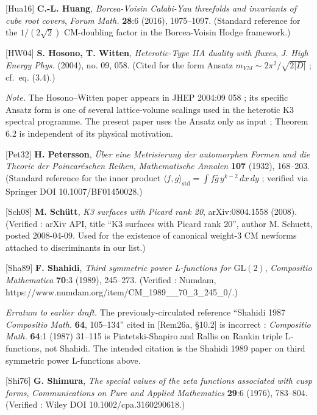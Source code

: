 \documentclass[
  11pt,
  a4paper,
]{amsart}
\begin{document}
{[}Hua16{]} \textbf{C.-L. Huang}, \emph{Borcea-Voisin Calabi-Yau threefolds and invariants of cube root covers}, \emph{Forum Math.} \textbf{28}:6 (2016), 1075--1097. (Standard reference for the \(1/(2\sqrt 2)\) CM-doubling factor in the Borcea-Voisin Hodge framework.)

{[}HW04{]} \textbf{S. Hosono, T. Witten}, \emph{Heterotic-Type IIA duality with fluxes}, \emph{J. High Energy Phys.} (2004), no. 09, 058. (Cited for the form Ansatz \(m_{YM}\sim 2\pi^{2}/\sqrt{2|D|}\) ; cf.~eq. (3.4).)

\emph{Note.} The Hosono--Witten paper appears in JHEP 2004:09 058 ; its specific Ansatz form is one of several lattice-volume scalings used in the heterotic K3 spectral programme. The present paper uses the Ansatz only as input ; Theorem 6.2 is independent of its physical motivation.

{[}Pet32{]} \textbf{H. Petersson}, \emph{Über eine Metrisierung der automorphen Formen und die Theorie der Poincaréschen Reihen}, \emph{Mathematische Annalen} \textbf{107} (1932), 168--203. (Standard reference for the inner product \(\langle f, g\rangle_{\mathrm{std}} = \int f \bar g\, y^{k-2}\,dx\,dy\) ; verified via Springer DOI 10.1007/BF01450028.)

{[}Sch08{]} \textbf{M. Schütt}, \emph{K3 surfaces with Picard rank 20}, arXiv:0804.1558 (2008). (Verified : arXiv API, title ``K3 surfaces with Picard rank 20'', author M. Schuett, posted 2008-04-09. Used for the existence of canonical weight-3 CM newforms attached to discriminants in our list.)

{[}Sha89{]} \textbf{F. Shahidi}, \emph{Third symmetric power L-functions for \(\mathrm{GL}(2)\)}, \emph{Compositio Mathematica} \textbf{70}:3 (1989), 245--273. (Verified : Numdam, https://www.numdam.org/item/CM\_1989\_\_70\_3\_245\_0/.)

\emph{Erratum to earlier draft.} The previously-circulated reference ``Shahidi 1987 \emph{Compositio Math.} \textbf{64}, 105--134'' cited in {[}Rem26a, §10.2{]} is incorrect : \emph{Compositio Math.} \textbf{64}:1 (1987) 31--115 is Piatetski-Shapiro and Rallis on Rankin triple L-functions, not Shahidi. The intended citation is the Shahidi 1989 paper on third symmetric power L-functions above.

{[}Shi76{]} \textbf{G. Shimura}, \emph{The special values of the zeta functions associated with cusp forms}, \emph{Communications on Pure and Applied Mathematics} \textbf{29}:6 (1976), 783--804. (Verified : Wiley DOI 10.1002/cpa.3160290618.)
\end{document}

